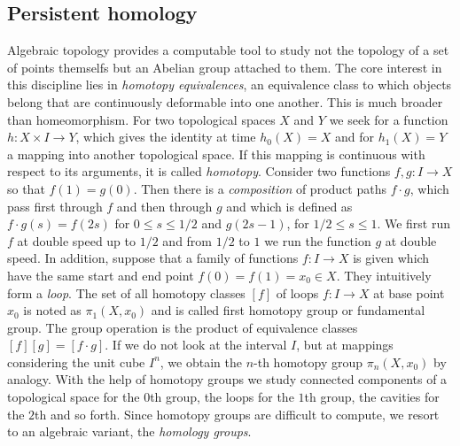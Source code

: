 \documentclass[runningheads,orivec]{llncs}
\begin{document}
\subsection{Persistent homology}
Algebraic topology provides a computable tool to study not the topology of a set of points themselfs but an Abelian group attached to them. The core interest in this discipline lies in \emph{homotopy equivalences}, an equivalence class to which objects belong that are continuously deformable into one another. This is much broader than homeomorphism. For two topological spaces $X$ and $Y$ we seek for a function $h: X \times I \rightarrow Y$, which gives the identity at time $h_0(X) = X$ and for $h_1(X) = Y$ a mapping into another topological space. If this mapping is continuous with respect to its arguments, it is called \emph{homotopy}. Consider two functions $f,g: I \rightarrow X$ so that $f(1) = g(0)$. Then there is a \emph{composition} of product paths $f \cdot g$, which pass first through $f$ and then through $g$ and which is defined as $f \cdot g (s) = f(2s)$ for $0 \leq s \leq 1/2$ and $g(2s - 1)$, for $1/2 \leq s \leq 1$. We first run $f$ at double speed up to $1/2$ and from $1/2$ to $1$ we run the function $g$ at double speed. In addition, suppose that a family of functions $f: I \rightarrow X$ is given which have the same start and end point $f(0) = f(1) = x_0 \in X$. They intuitively form a \emph{loop}. The set of all homotopy classes $[f]$ of loops $f: I \rightarrow X$ at base point $x_0$ is noted as $\pi_1(X,x_0)$ and is called first homotopy group or fundamental group. The group operation is the product of equivalence classes $[f][g] = [f \cdot g]$. If we do not look at the interval $I$, but at mappings considering the unit cube $I^n$, we obtain the $n$-th homotopy group $\pi_n(X,x_0)$ by analogy. With the help of homotopy groups we study connected components of a topological space for the $0$th group, the loops for the $1$th group, the cavities for the $2$th and so forth. Since homotopy groups are difficult to compute, we resort to an algebraic variant, the \emph{homology groups}.
\end{document}
